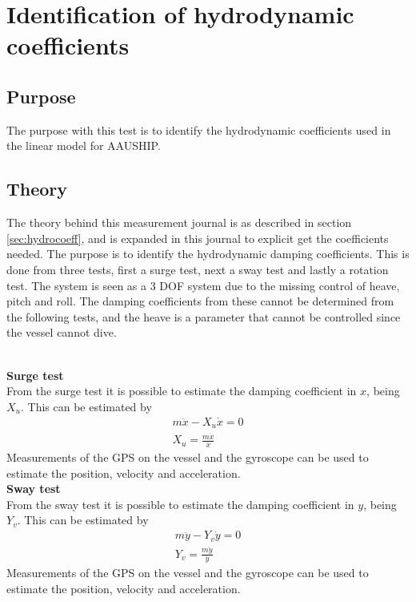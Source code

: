 \chapter{Identification of hydrodynamic coefficients}
\label{app:damping}
\section{Purpose}
The purpose with this test is to identify the hydrodynamic coefficients used in the linear model for AAUSHIP.

\section{Theory}
The theory behind this measurement journal is as described in section
\ref{sec:hydrocoeff}, and is expanded in this journal to explicit get the coefficients needed. The purpose is to identify the hydrodynamic
damping coefficients. This is done from three tests, first a surge
test, next a sway test and lastly a rotation test. The system is seen
as a 3 \ac{DOF} system due to the missing control of heave, pitch and
roll. The damping coefficients from these cannot be determined from
the following tests, and the heave is a parameter that cannot be controlled since the vessel cannot dive.


\\

\textbf{Surge test}\\
From the surge test it is possible to estimate the damping coefficient in $x$, being $X_u$. This can be estimated by
\begin{align}
m \ddot x - X_u \dot x = 0\nonumber\\
X_u = \frac{m \ddot x}{\dot x}
\end{align}
Measurements of the \ac{GPS} on the vessel and the gyroscope can be used to estimate the position, velocity and acceleration.\\

\textbf{Sway test}\\
From the sway test it is possible to estimate the damping coefficient in $y$, being $Y_v$. This can be estimated by
\begin{align}
m \ddot y - Y_v \dot y = 0\nonumber\\
Y_v = \frac{m \ddot y}{\dot y}
\end{align}
Measurements of the \ac{GPS} on the vessel and the gyroscope can be used to estimate
the position, velocity and acceleration.\\

